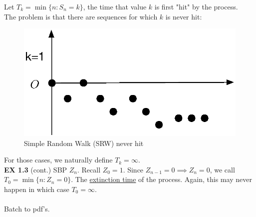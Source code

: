 \documentclass[12pt]{article}
\theoremstyle{definition}
\theoremstyle{plain}
\begin{document}
Let $T_k = \min \{n:S_n = k\}$, the time that value $k$ is first "hit" by the process.\\
The problem is that there are sequences for which $k$ is never hit: 
\begin{figure}[h]
\centering
\includegraphics[scale=.5]{SRW2.eps}
\caption{Simple Random Walk (SRW) never hit}
\label{1:SRW2}
\end{figure}
For those cases, we naturally define $T_k = \infty$. \\
\textbf{EX 1.3} (cont.) SBP $Z_n$. Recall $Z_0 = 1$. Since $Z_{n-1}=0\implies Z_n=0$, we call $T_0 = \min\{n: Z_n =0\}$. The \underline{extinction time} of the process. Again, this may never happen in which case $T_0 = \infty$. \\ \\
Batch to pdf's.
\end{document}
